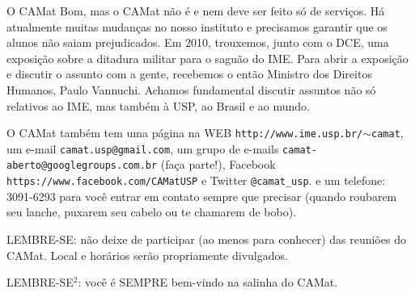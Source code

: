 \begin{secao}{O CAMat}
Bom, mas o CAMat não é e nem deve ser feito só de serviços. Há atualmente
muitas mudanças no nosso instituto e precisamos garantir que os alunos não
saiam prejudicados. Em 2010, trouxemos, junto com o
DCE, uma exposição sobre a ditadura militar para o saguão do IME. Para abrir a
exposição e discutir o assunto com a gente, recebemos o então Ministro dos
Direitos Humanos, Paulo Vannuchi. Achamos fundamental discutir assuntos não só
relativos ao IME, mas também à USP, ao Brasil e ao mundo.


O CAMat também tem uma página na WEB {\tt http://www.ime.usp.br/$\sim$camat}, um
e-mail {\tt camat.usp@gmail.com}, um grupo de e-mails {\tt camat-aberto@googlegroups.com.br} (faça parte!), Facebook {\tt https://www.facebook.com/CAMatUSP} e Twitter {\tt @camat\_usp}.
e um telefone: 3091-6293 para você entrar em contato sempre
que precisar (quando roubarem seu lanche, puxarem seu cabelo ou te chamarem de
bobo).

LEMBRE-SE: não deixe de participar (ao menos para conhecer) das reuniões do
CAMat. Local e horários serão propriamente divulgados.

LEMBRE-SE$^2$: você é SEMPRE bem-vindo na salinha do CAMat.

\end{secao}
